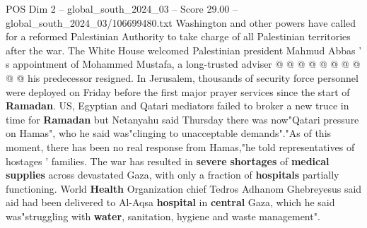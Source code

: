 \begin{textsample}{POS Dim 2 – global\_south\_2024\_03 – Score 29.00 – global\_south\_2024\_03/106699480.txt}
Washington and other powers have called for a reformed Palestinian Authority to take charge of all Palestinian territories after the war.
The White House welcomed Palestinian president Mahmud Abbas ' s appointment of Mohammed Mustafa, a long-trusted adviser @ @ @ @ @ @ @ @ @ @ his predecessor resigned.
In Jerusalem, thousands of security force personnel were deployed on Friday before the first major prayer services since the start of \textbf{Ramadan}.
US, Egyptian and Qatari mediators failed to broker a new truce in time for \textbf{Ramadan} but Netanyahu said Thursday there was now"Qatari pressure on Hamas", who he said was"clinging to unacceptable demands"."As of this moment, there has been no real response from Hamas,"he told representatives of hostages ' families.
The war has resulted in \textbf{severe} \textbf{shortages} of \textbf{medical} \textbf{supplies} across devastated Gaza, with only a fraction of \textbf{hospitals} partially functioning.
World \textbf{Health} Organization chief Tedros Adhanom Ghebreyesus said aid had been delivered to Al-Aqsa \textbf{hospital} in \textbf{central} Gaza, which he said was"struggling with \textbf{water}, sanitation, hygiene and waste management".

\end{textsample}
